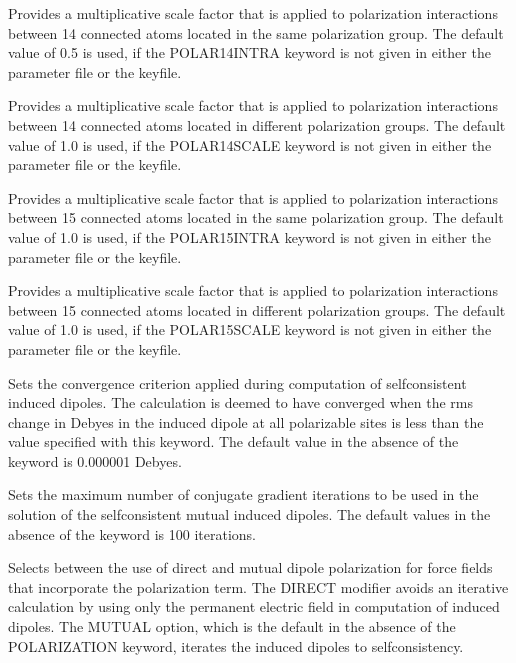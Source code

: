 \documentclass[letterpaper,11pt,english]{sphinxmanual}
\begin{document}
  Provides a multiplicative scale factor that is applied to polarization interactions between 1\sphinxhyphen{}4 connected atoms located in the same polarization group. The default value of 0.5 is used, if the POLAR\sphinxhyphen{}14\sphinxhyphen{}INTRA keyword is not given in either the parameter file or the keyfile.

  Provides a multiplicative scale factor that is applied to polarization interactions between 1\sphinxhyphen{}4 connected atoms located in different polarization groups. The default value of 1.0 is used, if the POLAR\sphinxhyphen{}14\sphinxhyphen{}SCALE keyword is not given in either the parameter file or the keyfile.

  Provides a multiplicative scale factor that is applied to polarization interactions between 1\sphinxhyphen{}5 connected atoms located in the same polarization group. The default value of 1.0 is used, if the POLAR\sphinxhyphen{}15\sphinxhyphen{}INTRA keyword is not given in either the parameter file or the keyfile.

  Provides a multiplicative scale factor that is applied to polarization interactions between 1\sphinxhyphen{}5 connected atoms located in different polarization groups. The default value of 1.0 is used, if the POLAR\sphinxhyphen{}15\sphinxhyphen{}SCALE keyword is not given in either the parameter file or the keyfile.

  Sets the convergence criterion applied during computation of self\sphinxhyphen{}consistent induced dipoles. The calculation is deemed to have converged when the rms change in Debyes in the induced dipole at all polarizable sites is less than the value specified with this keyword. The default value in the absence of the keyword is 0.000001 Debyes.

  Sets the maximum number of conjugate gradient iterations to be used in the solution of the self\sphinxhyphen{}consistent mutual induced dipoles. The default values in the absence of the keyword is 100 iterations.

  Selects between the use of direct and mutual dipole polarization for force fields that incorporate the polarization term. The DIRECT modifier avoids an iterative calculation by using only the permanent electric field in computation of induced dipoles. The MUTUAL option, which is the default in the absence of the POLARIZATION keyword, iterates the induced dipoles to self\sphinxhyphen{}consistency.
\end{document}
